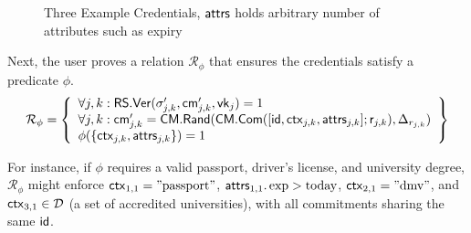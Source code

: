 \begin{figure}
        \begin{pchstack}[boxed, center, space=4em]
            \begin{pcvstack}
            \end{pcvstack}
            \pcvspace
            \begin{pcvstack}
            \end{pcvstack}
            \pcvspace
            \begin{pcvstack}
            \end{pcvstack}
        \end{pchstack}
    \caption{Three Example Credentials, $\mathsf{attrs}$ holds arbitrary number of attributes such as expiry}
    \label{fig:three-creds}
\end{figure}

Next, the user proves a relation $\mathcal{R}_\phi$ that ensures the credentials satisfy a predicate $\phi$. 
\[
\mathcal{R}_\phi = \left\{ 
\begin{array}{l} 
\forall j, k: \mathsf{RS.Ver}(\sigma_{j,k}', \mathsf{cm}_{j,k}', \mathsf{vk}_j) = 1 \\ 
\forall j, k: \mathsf{cm}_{j,k}' = \mathsf{CM.Rand}(\mathsf{CM.Com}([\mathsf{id}, \mathsf{ctx}_{j,k}, \mathsf{attrs}_{j,k}]; \mathsf{r}_{j,k}), \Delta_{r_{j,k}}) \\ 
\phi(\{\mathsf{ctx}_{j,k}, \mathsf{attrs}_{j,k}\}) = 1 
\end{array} 
\right\}
\]

For instance, if $\phi$ requires a valid passport, driver’s license, and university degree, $\mathcal{R}_\phi$ might enforce $\mathsf{ctx}_{1,1} = \text{''passport''}$, $\mathsf{attrs}_{1,1}.\exp > \text{today}$, $\mathsf{ctx}_{2,1} = \text{''dmv''}$, and $\mathsf{ctx}_{3,1} \in \mathcal{D}$ (a set of accredited universities), with all commitments sharing the same $\mathsf{id}$.


